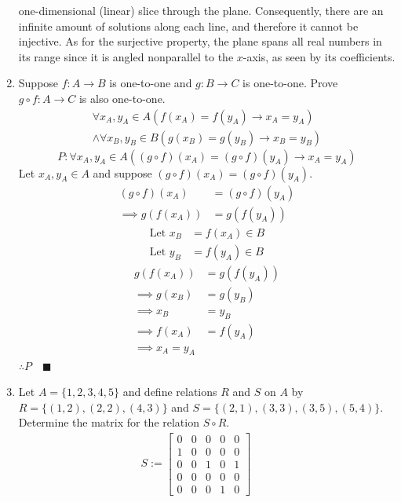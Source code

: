 \documentclass[letterpaper, 12pt]{article}
\newcommand{\qed}{\quad \blacksquare}
\newcommand{\then}{\rightarrow}
\newcommand{\0}{\emptyset}
\begin{document}
\begin{enumerate}
\begin{flushleft}
    one-dimensional (linear) slice through the plane. Consequently, there are an infinite amount 
    of solutions along each line, and therefore it cannot be injective. As for the surjective 
    property, the plane spans all real numbers in its range since it is angled nonparallel to 
    the $x$-axis, as seen by its coefficients.
\end{flushleft}
\item Suppose $f: A \to B$ is one-to-one and $g: B \to C$ is one-to-one. 
Prove $g \circ f: A \to C$ is also one-to-one.
\begin{multline*}
    \forall x_A, y_A \in A(f(x_A) = f(y_A) \then x_A = y_A) \\
    \wedge \forall x_B, y_B \in B(g(x_B) = g(y_B) \then x_B = y_B)
\end{multline*}
\[P: \forall x_A, y_A \in A((g \circ f)(x_A) = (g \circ f)(y_A) \then x_A = y_A)\]
Let $x_A, y_A \in A$ and suppose $(g \circ f)(x_A) = (g \circ f)(y_A)$.
\begin{align*}
    (g \circ f)(x_A) &= (g \circ f)(y_A) \\
    \implies g(f(x_A)) &= g(f(y_A))
\end{align*}
\begin{align*}
    \text{Let } x_B &= f(x_A) \in B \\
    \text{Let } y_B &= f(y_A) \in B
\end{align*}
\begin{align*}
    g(f(x_A)) &= g(f(y_A)) \\
    \implies g(x_B) &= g(y_B) \\
    \implies x_B &= y_B \\
    \implies f(x_A) &= f(y_A) \\
    \implies x_A = y_A
\end{align*}
$\therefore P \qed$
\pagebreak
\item Let $A = \{1,2,3,4,5\}$ and define relations $R$ and $S$ on $A$ by $R = \{(1,2),(2,2),(4,3)\}$ 
and $S = \{(2,1),(3,3),(3,5),(5,4)\}$. Determine the matrix for the relation $S \circ R$.
\begin{gather*}
    S := \begin{bmatrix}
        0 & 0 & 0 & 0 & 0 \\
        1 & 0 & 0 & 0 & 0 \\
        0 & 0 & 1 & 0 & 1 \\
        0 & 0 & 0 & 0 & 0 \\
        0 & 0 & 0 & 1 & 0
    \end{bmatrix} \qquad

\end{gather*}
\end{enumerate}
\end{document}
